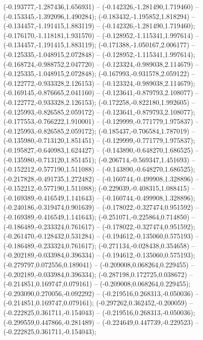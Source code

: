  (-0.193777,-1.287436,1.656931) -- (-0.142326,-1.281490,1.719460) -- (-0.153345,-1.392096,1.490284);
 (-0.183432,-1.195852,1.818294) -- (-0.134457,-1.191415,1.883119) -- (-0.142326,-1.281490,1.719460);
 (-0.176170,-1.118181,1.931570) -- (-0.128952,-1.115341,1.997614) -- (-0.134457,-1.191415,1.883119);
 (-0.171388,-1.050167,2.006177) -- (-0.125335,-1.048915,2.072848) -- (-0.128952,-1.115341,1.997614);
 (-0.168724,-0.988752,2.047720) -- (-0.123324,-0.989038,2.114679) -- (-0.125335,-1.048915,2.072848);
 (-0.167993,-0.931578,2.059122) -- (-0.122772,-0.933328,2.126153) -- (-0.123324,-0.989038,2.114679);
 (-0.169145,-0.876665,2.041160) -- (-0.123641,-0.879793,2.108077) -- (-0.122772,-0.933328,2.126153);
 (-0.172258,-0.822180,1.992605) -- (-0.125993,-0.826585,2.059172) -- (-0.123641,-0.879793,2.108077);
 (-0.177553,-0.766222,1.910001) -- (-0.129999,-0.771779,1.975837) -- (-0.125993,-0.826585,2.059172);
 (-0.185437,-0.706584,1.787019) -- (-0.135980,-0.713120,1.851451) -- (-0.129999,-0.771779,1.975837);
 (-0.195827,-0.640983,1.624427) -- (-0.143890,-0.648270,1.686525) -- (-0.135980,-0.713120,1.851451);
 (-0.206714,-0.569347,1.451693) -- (-0.152212,-0.577190,1.511088) -- (-0.143890,-0.648270,1.686525);
 (-0.217828,-0.491735,1.272482) -- (-0.160744,-0.499908,1.328896) -- (-0.152212,-0.577190,1.511088);
 (-0.229039,-0.408315,1.088415) -- (-0.169389,-0.416549,1.141643) -- (-0.160744,-0.499908,1.328896);
 (-0.240186,-0.319474,0.901639) -- (-0.178022,-0.327474,0.951592) -- (-0.169389,-0.416549,1.141643);
 (-0.251071,-0.225864,0.714850) -- (-0.186489,-0.233324,0.761617) -- (-0.178022,-0.327474,0.951592);
 (-0.261470,-0.128432,0.531284) -- (-0.194612,-0.135060,0.575193) -- (-0.186489,-0.233324,0.761617);
 (-0.271134,-0.028438,0.354658) -- (-0.202189,-0.033984,0.396334) -- (-0.194612,-0.135060,0.575193);
 (-0.279797,0.072556,0.189041) -- (-0.209008,0.068264,0.229455) -- (-0.202189,-0.033984,0.396334);
 (-0.287198,0.172725,0.038672) -- (-0.214851,0.169747,0.079161) -- (-0.209008,0.068264,0.229455);
 (-0.293090,0.270056,-0.092292) -- (-0.219516,0.268313,-0.050036) -- (-0.214851,0.169747,0.079161);
 (-0.297262,0.362452,-0.200059) -- (-0.222825,0.361711,-0.154043) -- (-0.219516,0.268313,-0.050036);
 (-0.299559,0.447866,-0.281489) -- (-0.224649,0.447739,-0.229523) -- (-0.222825,0.361711,-0.154043);
